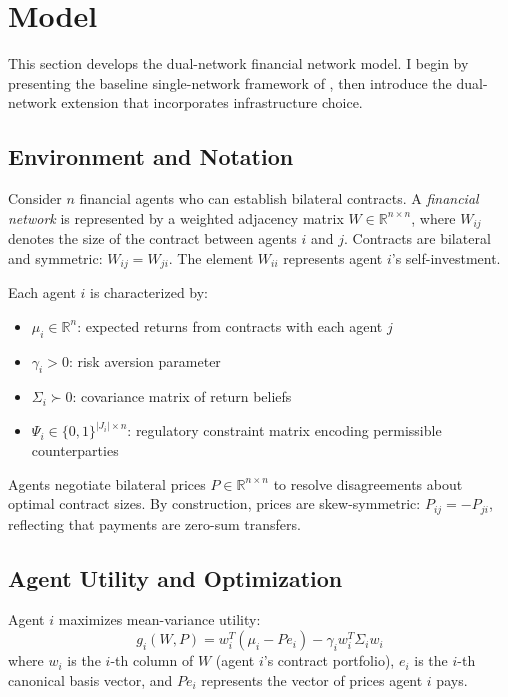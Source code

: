 \documentclass[12pt]{article}
\newcommand{\R}{\mathbb{R}}
\begin{document}
\section{Model}
\label{sec:model}

This section develops the dual-network financial network model. I begin by presenting the baseline single-network framework of \citet{jalan_incentive-aware_2024}, then introduce the dual-network extension that incorporates infrastructure choice.

\subsection{Environment and Notation}

Consider $n$ financial agents who can establish bilateral contracts. A \textit{financial network} is represented by a weighted adjacency matrix $W \in \R^{n \times n}$, where $W_{ij}$ denotes the size of the contract between agents $i$ and $j$. Contracts are bilateral and symmetric: $W_{ij} = W_{ji}$. The element $W_{ii}$ represents agent $i$'s self-investment.

Each agent $i$ is characterized by:
\begin{itemize}[noitemsep]
    \item $\mu_i \in \R^n$: expected returns from contracts with each agent $j$
    \item $\gamma_i > 0$: risk aversion parameter
    \item $\Sigma_i \succ 0$: covariance matrix of return beliefs
    \item $\Psi_i \in \{0,1\}^{|J_i| \times n}$: regulatory constraint matrix encoding permissible counterparties
\end{itemize}

Agents negotiate bilateral prices $P \in \R^{n \times n}$ to resolve disagreements about optimal contract sizes. By construction, prices are skew-symmetric: $P_{ij} = -P_{ji}$, reflecting that payments are zero-sum transfers.

\subsection{Agent Utility and Optimization}

Agent $i$ maximizes mean-variance utility:
\begin{equation}
g_i(W, P) = w_i^T(\mu_i - Pe_i) - \gamma_i w_i^T \Sigma_i w_i
\label{eq:single_network_utility}
\end{equation}
where $w_i$ is the $i$-th column of $W$ (agent $i$'s contract portfolio), $e_i$ is the $i$-th canonical basis vector, and $P e_i$ represents the vector of prices agent $i$ pays.
\end{document}
